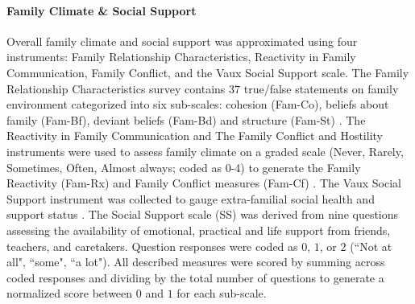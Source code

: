 \documentclass[utf8]{article}
\begin{document}
\paragraph{Family Climate \& Social Support}
Overall family climate and social support was approximated using four instruments: Family Relationship Characteristics, Reactivity in Family Communication, Family Conflict, and the Vaux Social Support scale. The Family Relationship Characteristics survey contains $37$ true/false statements on family environment categorized into six sub-scales: cohesion (Fam-Co), beliefs about family (Fam-Bf), deviant beliefs (Fam-Bd) and structure (Fam-St) \citep{tolan1997assessment}. The Reactivity in Family Communication and The Family Conflict and Hostility instruments were used to assess family climate on a graded scale (Never, Rarely, Sometimes, Often, Almost always; coded as 0-4) to generate the Family Reactivity (Fam-Rx) and Family Conflict measures (Fam-Cf) \citep{thornberry2003gangs,henry2004study}. The Vaux Social Support instrument was collected to gauge extra-familial social health and support status \citep{vaux1988social}. The Social Support scale (SS) was derived from nine questions assessing the availability of emotional, practical and life support from friends, teachers, and caretakers. Question responses were coded as $0$, $1$, or $2$ (``Not at all", ``some", ``a lot"). All described measures were scored by summing across coded responses and dividing by the total number of questions to generate a normalized score between $0$ and $1$ for each sub-scale.
\end{document}
